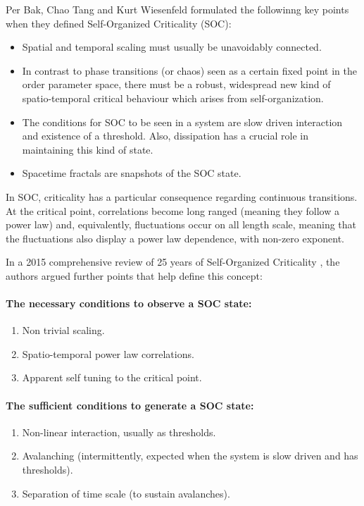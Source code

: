 Per Bak, Chao Tang and Kurt Wiesenfeld \cite{BTW} formulated the followinng key points when they defined Self-Organized Criticality (SOC):
\begin{itemize}
	\item Spatial and temporal scaling must usually be unavoidably connected.
	\item In contrast to phase transitions (or chaos) seen as a certain fixed point in the order parameter space, there must be a robust, widespread new kind of spatio-temporal critical behaviour which arises from self-organization.
	\item The conditions for SOC to be seen in a system are slow driven interaction and existence of a threshold. Also, dissipation has a crucial role in maintaining this kind of state.
	\item Spacetime fractals are snapshots of the SOC state.
\end{itemize}\par
In SOC, criticality has a particular consequence regarding continuous transitions. At the critical point, correlations become long ranged (meaning they follow a power law) and, equivalently, fluctuations occur on all length scale, meaning that the fluctuations also display a power law dependence, with non-zero exponent.\

\vspace{5mm}
In a 2015 comprehensive review of 25 years of Self-Organized Criticality \cite{Watkins2015}, the authors argued further points that help define this concept:

\paragraph{The necessary conditions to observe a SOC state:}
\begin{enumerate}
	\item Non trivial scaling.
	\item Spatio-temporal power law correlations.
	\item Apparent self tuning to the critical point.
\end{enumerate}\par 

\paragraph{The sufficient conditions to generate a SOC state:}
\begin{enumerate}
	\item Non-linear interaction, usually as thresholds.
	\item Avalanching (intermittently, expected when the system is slow driven and has thresholds).
	\item Separation of time scale (to sustain avalanches).
\end{enumerate}

